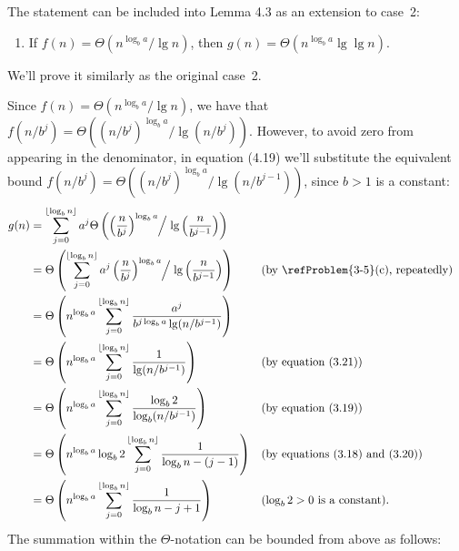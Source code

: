 \starred
The statement can be included into Lemma 4.3 as an extension to case~2:
\begin{enumerate}[start=2,label=\arabic*$'$.]
    \item If $f(n)=\Theta(n^{\log_ba}/\lg n)$, then $g(n)=\Theta(n^{\log_ba}\lg\lg n)$.
\end{enumerate}
We'll prove it similarly as the original case~2.

Since $f(n)=\Theta(n^{\log_ba}/\lg n)$, we have that $f(n/b^j)=\Theta((n/b^j)^{\log_ba}/\lg(n/b^j))$.
However, to avoid zero from appearing in the denominator, in equation (4.19) we'll substitute the equivalent bound $f(n/b^j)=\Theta((n/b^j)^{\log_ba}/\lg(n/b^{j-1}))$, since $b>1$ is a constant:
\begin{align*}
    g(n) &= \sum_{j=0}^{\lfloor\log_bn\rfloor}a^j\Theta\left(\left(\frac{n}{b^j}\right)^{\log_ba}\!\!\Bigm/\lg\left(\frac{n}{b^{j-1}}\right)\right) \\
    &= \Theta\left(\sum_{j=0}^{\lfloor\log_bn\rfloor}a^j\left(\frac{n}{b^j}\right)^{\log_ba}\!\!\Bigm/\lg\left(\frac{n}{b^{j-1}}\right)\right) && \text{(by \refProblem{3-5}(c), repeatedly)} \\
    &= \Theta\left(n^{\log_ba}\sum_{j=0}^{\lfloor\log_bn\rfloor}\frac{a^j}{b^{j\log_ba}\lg(n/b^{j-1})}\right) \\
    &= \Theta\left(n^{\log_ba}\sum_{j=0}^{\lfloor\log_bn\rfloor}\frac{1}{\lg(n/b^{j-1})}\right) && \text{(by equation (3.21))} \\
    &= \Theta\left(n^{\log_ba}\sum_{j=0}^{\lfloor\log_bn\rfloor}\frac{\log_b2}{\log_b(n/b^{j-1})}\right) && \text{(by equation (3.19))} \\
    &= \Theta\left(n^{\log_ba}\log_b2\sum_{j=0}^{\lfloor\log_bn\rfloor}\frac{1}{\log_bn-(j-1)}\right) && \text{(by equations (3.18) and (3.20))} \\
    &= \Theta\left(n^{\log_ba}\sum_{j=0}^{\lfloor\log_bn\rfloor}\frac{1}{\log_bn-j+1}\right) && \text{($\log_b2>0$ is a constant)}.
\end{align*}
The summation within the $\Theta$-notation can be bounded from above as follows:
